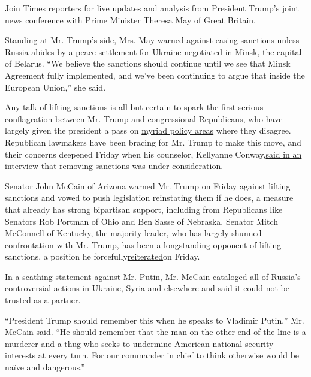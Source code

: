Join Times reporters for live updates and analysis from President
Trump's joint news conference with Prime Minister Theresa May of Great
Britain.

Standing at Mr. Trump's side, Mrs. May warned against easing sanctions
unless Russia abides by a peace settlement for Ukraine negotiated in
Minsk, the capital of Belarus. ``We believe the sanctions should
continue until we see that Minsk Agreement fully implemented, and we've
been continuing to argue that inside the European Union,'' she said.

Any talk of lifting sanctions is all but certain to spark the first
serious conflagration between Mr. Trump and congressional Republicans,
who have largely given the president a pass on
\href{https://mobile.nytimes3xbfgragh.onion/2017/01/26/us/politics/trump-republican-retreat.html?hp=\&action=click\&pgtype=Homepage\&clickSource=story-heading\&module=b-lede-package-region\&region=top-news\&WT.nav=top-news\&smid=tw-nytpolitics\&smtyp=cur\&referer=https://t.co/MklSBYHS66}{myriad
policy areas} where they disagree. Republican lawmakers have been
bracing for Mr. Trump to make this move, and their concerns deepened
Friday when his counselor, Kellyanne
Conway,\href{https://twitter.com/foxandfriends/status/824966414456852480}{said
in an interview} that removing sanctions was under consideration.

Senator John McCain of Arizona warned Mr. Trump on Friday against
lifting sanctions and vowed to push legislation reinstating them if he
does, a measure that already has strong bipartisan support, including
from Republicans like Senators Rob Portman of Ohio and Ben Sasse of
Nebraska. Senator Mitch McConnell of Kentucky, the majority leader, who
has largely shunned confrontation with Mr. Trump, has been a
longstanding opponent of lifting sanctions, a position he
forcefully\href{http://www.politico.com/story/2017/01/mitch-mcconnell-trump-russia-sanctions-234281}{reiterated}on
Friday.

In a scathing statement against Mr. Putin, Mr. McCain cataloged all of
Russia's controversial actions in Ukraine, Syria and elsewhere and said
it could not be trusted as a partner.

``President Trump should remember this when he speaks to Vladimir
Putin,'' Mr. McCain said. ``He should remember that the man on the other
end of the line is a murderer and a thug who seeks to undermine American
national security interests at every turn. For our commander in chief to
think otherwise would be naïve and dangerous.''

